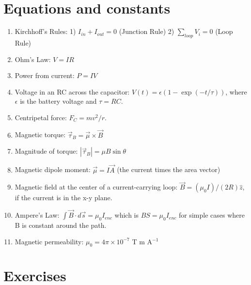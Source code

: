 \documentclass[10pt]{article}
\begin{document}
\maketitle

\section{Equations and constants}

\begin{enumerate}
\item Kirchhoff's Rules: 1) $I_{in} + I_{out} = 0$ (Junction Rule) 2) $\sum_{loop} V_i = 0$ (Loop Rule)
\item Ohm's Law: $V = IR$
\item Power from current: $P=IV$
\item Voltage in an RC across the capacitor: $V(t) = \epsilon\left(1 - \exp\left(-t/\tau\right)\right)$, where $\epsilon$ is the battery voltage and $\tau = RC$.
\item Centripetal force: $F_C = mv^2/r$.
\item Magnetic torque: $\vec{\tau}_B = \vec{\mu} \times \vec{B}$
\item Magnitude of torque: $|\vec{\tau}_B| = \mu B \sin\theta$
\item Magnetic dipole moment: $\vec{\mu} = I \vec{A}$ (the current times the area vector)
\item Magnetic field at the center of a current-carrying loop: $\vec{B} = (\mu_0 I)/(2 R)\hat{z}$, if the current is in the x-y plane.
\item Ampere's Law: $\int \vec{B} \cdot d\vec{s} = \mu_0 I_{enc}$ which is $B S = \mu_0 I_{enc}$ for simple cases where B is constant around the path.
\item Magnetic permeability: $\mu_0 = 4\pi \times 10^{-7}$ T m A$^{-1}$
\end{enumerate}

\section{Exercises}
\end{document}
